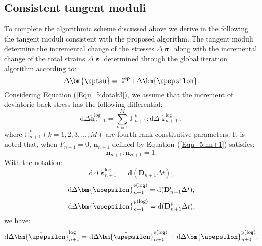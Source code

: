 \subsection{Consistent tangent moduli}
\noindent
To complete the algorithmic scheme discussed above we derive in the following the tangent moduli consistent with the proposed algorithm. The tangent moduli determine the incremental change of the stresses $\Delta {\bm{\upsigma }}$ along with the incremental change of the total strains $\Delta {\bm{\upepsilon }}$ determined through the global iteration algorithm according to:
\begin{equation}
\Delta {\bm{\uptau }} = {\mathbb{D}^{\rm{ep}}}:\Delta {\bm{\upepsilon }}.
\end{equation}
Considering Equation (\ref{Equ_5:dotak3}), we assume that the increment of deviatoric back stress has the following differential:
\begin{equation}
\label{Equ_5:dan+1}
{\text{d}}\Delta \mathring {\mathbf{a}}_{n + 1}^{\log } = \sum\limits_{k = 1}^M {\mathbb{H}_{n + 1}^k} :{\text{d}}\Delta \mathring {\bm{\upepsilon}}_{n + 1}^{\log },
\end{equation}
where $\mathbb{H}_{n + 1}^k( k = 1,2,3,...,M )$ are fourth-rank constitutive parameters.
It is noted that, when ${F_{n + 1}} = 0$, ${\mathbf{n}}_{n + 1}$ defined by Equation (\ref{Equ_5:nn+1}) satisfies:
\begin{equation}
\label{Equ_5:nn1}
{{\mathbf{n}}_{n + 1}}:{{\mathbf{n}}_{n + 1}} = 1.
\end{equation}
With the notation:
\begin{equation}
{\text{d}}\Delta \mathring {\bm{\upepsilon}}_{n + 1}^{\log } = {\text{d}}(\mathbf{D}_{n+1} \Delta t),
\end{equation}
\begin{equation}
{\text{d}}\Delta \mathring {\bm{\upepsilon}}_{n + 1}^{\rm e(\log) } = {\text{d}}(\mathbf{D}_{n+1}^{\rm e} \Delta t),
\end{equation}
\begin{equation}
{\text{d}}\Delta \mathring {\bm{\upepsilon}}_{n + 1}^{\rm p(\log) } = {\text{d}}(\mathbf{D}_{n+1}^{\rm p} \Delta t),
\end{equation}
we have:
\begin{equation}
{\text{d}}\Delta \mathring {\bm{\upepsilon}}_{n + 1}^{\log } = {\text{d}}\Delta \mathring {\bm{\upepsilon}}_{n + 1}^{\rm e(\log) } + {\text{d}}\Delta \mathring {\bm{\upepsilon}}_{n + 1}^{\rm p(\log) }.
\end{equation}
